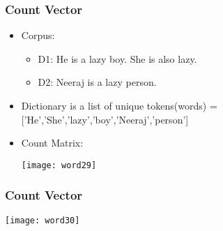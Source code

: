 





\begin{frame}[fragile]\frametitle{Count Vector}
\begin{itemize}
\item Corpus:
\begin{itemize}
\item D1: He is a lazy boy. She is also lazy.
\item D2: Neeraj is a lazy person.
\end{itemize}
\item Dictionary is a list of unique tokens(words) =['He','She','lazy','boy','Neeraj','person'] 
\item Count Matrix:
\begin{center}
\texttt{[image: word29]}
\end{center}
\end{itemize}
\end{frame}

\begin{frame}[fragile]\frametitle{Count Vector}
\begin{center}
\texttt{[image: word30]}
\end{center}
\end{frame}





